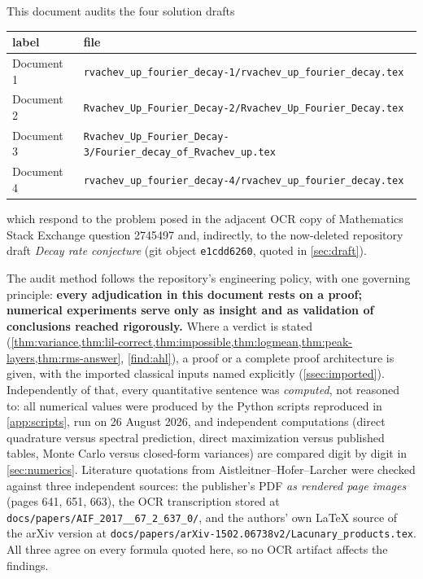 \documentclass[11pt,oneside]{article}
\theoremstyle{definition}
\theoremstyle{remark}
\begin{document}
This document audits the four solution drafts
\begin{center}
\begin{tabular}{@{}ll@{}}
\toprule
label & file \\
\midrule
Document 1 & \nolinkurl{rvachev_up_fourier_decay-1/rvachev_up_fourier_decay.tex} \\
Document 2 & \nolinkurl{Rvachev_Up_Fourier_Decay-2/Rvachev_Up_Fourier_Decay.tex} \\
Document 3 & \nolinkurl{Rvachev_Up_Fourier_Decay-3/Fourier_decay_of_Rvachev_up.tex} \\
Document 4 & \nolinkurl{rvachev_up_fourier_decay-4/rvachev_up_fourier_decay.tex} \\
\bottomrule
\end{tabular}
\end{center}
which respond to the problem posed in the adjacent OCR copy of Mathematics
Stack Exchange question 2745497 \cite{mse-decay} and, indirectly, to the
now-deleted repository draft \emph{Decay rate conjecture}
(git object \nolinkurl{e1cdd6260}, quoted in \cref{sec:draft}).

The audit method follows the repository's engineering policy, with one
governing principle: \textbf{every adjudication in this document rests on
a proof; numerical experiments serve only as insight and as validation of
conclusions reached rigorously.}  Where a verdict is stated
(\cref{thm:variance,thm:lil-correct,thm:impossible,thm:logmean,thm:peak-layers,thm:rms-answer},
\cref{find:ahl}), a proof or a complete proof architecture is given, with
the imported classical inputs named explicitly
(\cref{ssec:imported}).  Independently of that, every quantitative
sentence was \emph{computed}, not reasoned to: all numerical values were
produced by the Python scripts reproduced in \cref{app:scripts}, run on
26 August 2026, and independent computations (direct quadrature versus
spectral prediction, direct maximization versus published tables, Monte
Carlo versus closed-form variances) are compared digit by digit in
\cref{sec:numerics}.  Literature quotations from
Aistleitner--Hofer--Larcher \cite{ahl2017} were checked against three
independent sources: the publisher's PDF \emph{as rendered page images}
(pages 641, 651, 663), the OCR transcription stored at
\nolinkurl{docs/papers/AIF_2017__67_2_637_0/}, and the authors' own
\LaTeX{} source of the arXiv version at
\nolinkurl{docs/papers/arXiv-1502.06738v2/Lacunary_products.tex}.  All
three agree on every formula quoted here, so no OCR artifact affects the
findings.
\end{document}
